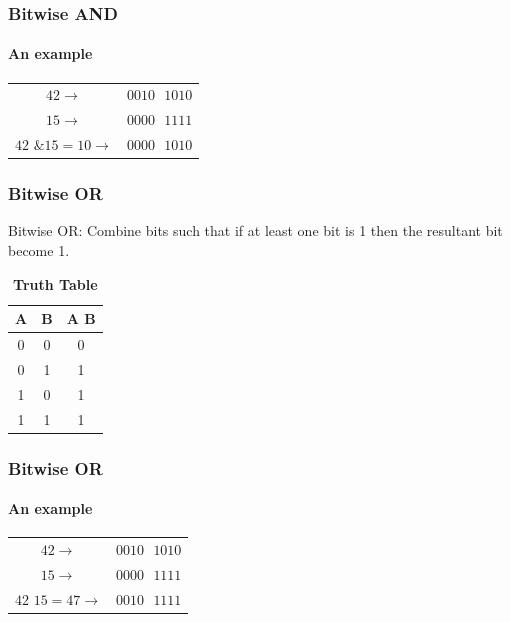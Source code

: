 \documentclass[table, compress]{beamer}
\begin{document}
\begin{frame}
    \frametitle{Bitwise AND}
    \framesubtitle{An example}
    
    \begin{table}
    \centering
    \begin{tabular}{c  c}
    	$42\rightarrow$ & $0010\textrm{ }1010$\\
    	$15\rightarrow$ & $0000\textrm{ }1111$\\ \hline
    	$42\textrm{ \& }15 = 10\rightarrow$ & $0000\textrm{ }1010$\\
    \end{tabular}
    \end{table}
\end{frame}


\begin{frame}
    \frametitle{Bitwise OR}
    \begin{block}{Bitwise OR: \textbf{\textbar}}
    	Combine bits such that if at least one bit is 1 then the resultant bit become 1.
    \end{block}
    
    \begin{table}
    \centering
    \begin{tabular}{| c  c c |}
    	\hline
    	A & B & A \textbf{\textbar} B\\ \hline\hline
    	0 & 0 & 0 \\ \hline
    	0 & 1 & 1 \\ \hline
    	1 & 0 & 1 \\ \hline
    	1 & 1 & 1 \\ \hline
    \end{tabular}
    \caption*{\textbf{Truth Table}}
    \end{table}

\end{frame}


\begin{frame}
    \frametitle{Bitwise OR}
    \framesubtitle{An example}
    
    \begin{table}
    \centering
    \begin{tabular}{c  c}
    	$42\rightarrow$ & $0010\textrm{ }1010$\\
    	$15\rightarrow$ & $0000\textrm{ }1111$\\ \hline
    	$42$ \textbf{\textbar} $15 = 47\rightarrow$ & $0010\textrm{ }1111$\\
    \end{tabular}
    \end{table}
\end{frame}
\end{document}
